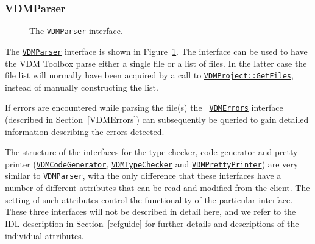 \documentclass[\pformat,12pt]{article}
\newcommand{\VDMCodeGenerator}{\hyperlink{interface.VDMCodeGenerator}{VDMCodeGenerator}}
\newcommand{\VDMErrors}{\hyperlink{interface.VDMErrors}{VDMErrors}}
\newcommand{\VDMParser}{\hyperlink{interface.VDMParser}{VDMParser}}
\newcommand{\VDMPrettyPrinter}{\hyperlink{interface.VDMPrettyPrinter}{VDMPrettyPrinter}}
\newcommand{\VDMTypeChecker}{\hyperlink{interface.VDMTypeChecker}{VDMTypeChecker}}
\begin{document}
\subsubsection{VDMParser}


\begin{figure}[tbh]
\begin{center}
\mbox{}
\caption{The {\tt VDMParser} interface.}\label{fig:VDMParser}
\end{center}
\end{figure}


The {\tt \VDMParser} interface is shown in Figure~\ref{fig:VDMParser}.
The interface can be used to have the VDM Toolbox parse either a
single file or a list of files. In the latter case the file list will
normally have been acquired by a call to 
\texttt{\hyperlink{method.VDMProject::GetFiles}{VDMProject::GetFiles}},
instead of manually constructing the list.

If errors are encountered while parsing the file(s) the {\tt
  \VDMErrors} interface (described in Section~\ref{VDMErrors}) can
subsequently be queried to gain detailed information describing the
errors detected. 

The structure of the interfaces for the type checker, code generator
and pretty printer ({\tt \VDMCodeGenerator}, {\tt \VDMTypeChecker} and
{\tt \VDMPrettyPrinter}) are very similar to {\tt \VDMParser}, with the
only difference that these interfaces have a number of different
attributes that can be read and modified from the client. The setting
of such attributes control the functionality of the particular
interface. These three interfaces will not be described in detail
here, and we refer to the IDL description in Section~\ref{refguide} for
further details and descriptions of the individual attributes.
\end{document}
